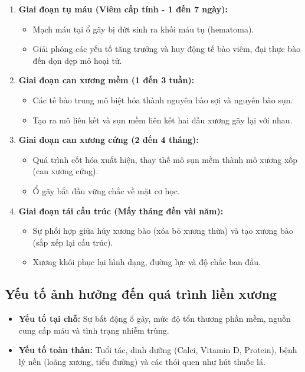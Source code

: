 \begin{enumerate}
    \item \textbf{Giai đoạn tụ máu (Viêm cấp tính - 1 đến 7 ngày):}
    \begin{itemize}
        \item Mạch máu tại ổ gãy bị đứt sinh ra khối máu tụ (hematoma).
        \item Giải phóng các yếu tố tăng trưởng và huy động tế bào viêm, đại thực bào đến dọn dẹp mô hoại tử.
    \end{itemize}

    \item \textbf{Giai đoạn can xương mềm (1 đến 3 tuần):}
    \begin{itemize}
        \item Các tế bào trung mô biệt hóa thành nguyên bào sợi và nguyên bào sụn.
        \item Tạo ra mô liên kết và sụn mềm liên kết hai đầu xương gãy lại với nhau.
    \end{itemize}

    \item \textbf{Giai đoạn can xương cứng (2 đến 4 tháng):}
    \begin{itemize}
        \item Quá trình cốt hóa xuất hiện, thay thế mô sụn mềm thành mô xương xốp (can xương cứng).
        \item Ổ gãy bắt đầu vững chắc về mặt cơ học.
    \end{itemize}

    \item \textbf{Giai đoạn tái cấu trúc (Mấy tháng đến vài năm):}
    \begin{itemize}
        \item Sự phối hợp giữa hủy xương bào (xóa bỏ xương thừa) và tạo xương bào (sắp xếp lại cấu trúc).
        \item Xương khôi phục lại hình dạng, đường lực và độ chắc ban đầu.
    \end{itemize}
\end{enumerate}

\subsection{Yếu tố ảnh hưởng đến quá trình liền xương}

\begin{itemize}
    \item \textbf{Yếu tố tại chỗ:} Sự bất động ổ gãy, mức độ tổn thương phần mềm, nguồn cung cấp máu và tình trạng nhiễm trùng.
    \item \textbf{Yếu tố toàn thân:} Tuổi tác, dinh dưỡng (Calci, Vitamin D, Protein), bệnh lý nền (loãng xương, tiểu đường) và các thói quen như hút thuốc lá.
\end{itemize}

